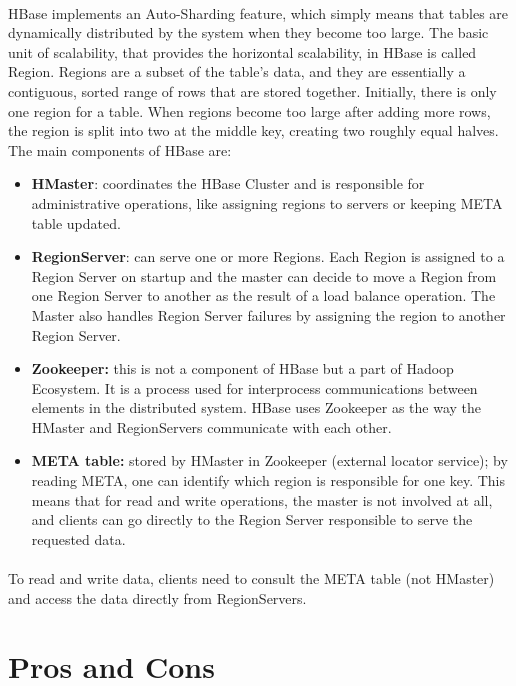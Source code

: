 \documentclass[11pt, a4paper]{article}
\begin{document}
\paragraph{}HBase implements an Auto-Sharding feature, which simply means that tables are dynamically distributed by the system when they become too large. The basic unit of scalability, that provides the horizontal scalability, in HBase is called Region. Regions are a subset of the table’s data, and they are essentially a contiguous, sorted range of rows that are stored together. Initially, there is only one region for a table.  When regions become too large after adding more rows, the region is split into two at the middle key, creating two roughly equal halves. The main components of HBase are:
\begin{itemize}
\item\textbf{HMaster}: coordinates the HBase Cluster and is responsible for administrative operations, like assigning regions to servers or keeping META table updated.
\item\textbf{RegionServer}: can serve one or more Regions. Each Region is assigned to a Region Server on startup and the master can decide to move a Region from one Region Server to another as the result of a load balance operation. The Master also handles Region Server failures by assigning the region to another Region Server.
\item\textbf{Zookeeper:} this is not a component of HBase but a part of Hadoop Ecosystem. It is a process used for interprocess communications between elements in the distributed system. HBase uses Zookeeper as the way the HMaster and RegionServers communicate with each other. 
\item\textbf{META table:} stored by HMaster in Zookeeper (external locator service); by reading META, one can identify which region is responsible for one key. This means that for read and write operations, the master is not involved at all, and clients can go directly to the Region Server responsible to serve the requested data.
\end{itemize}
\paragraph{}To read and write data, clients need to consult the META table (not HMaster) and access the data directly from RegionServers. 

\section{Pros and Cons}
\end{document}
